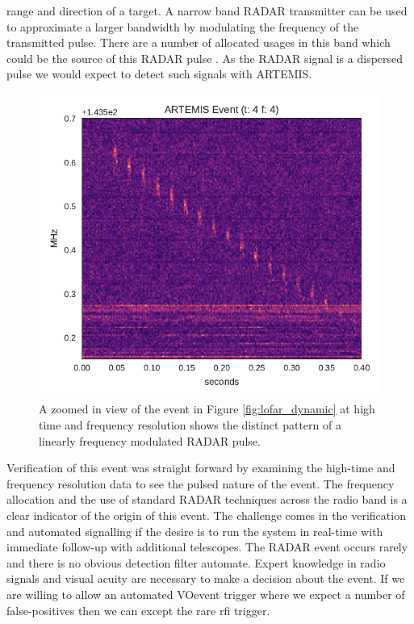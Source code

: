 \documentclass[a4paper,fleqn,usenatbib]{mnras}
\begin{document}
range and direction of a target. A narrow band RADAR transmitter can be used to
approximate a larger bandwidth by modulating the frequency of the transmitted
pulse. There are a number of allocated usages in this band which could be the
source of this RADAR pulse \citep{ofcom2017}.  As the RADAR signal is a
dispersed pulse we would expect to detect such signals with ARTEMIS.
%
\begin{figure}
    \includegraphics[width=1.0\linewidth]{figures/LOFAR_dynamic_high_res.pdf}
    \caption{A zoomed in view of the event in Figure \ref{fig:lofar_dynamic} at
    high time and frequency resolution shows the distinct pattern of a linearly frequency
    modulated RADAR pulse.
    }
    \label{fig:lofar_dynamic_high}
\end{figure}
%
Verification of this event was straight forward by examining the high-time and
frequency resolution data to see the pulsed nature of the event. The frequency
allocation and the use of standard RADAR techniques across the radio band is a
clear indicator of the origin of this event. The challenge comes in the
verification and automated signalling if the desire is to run the system in
real-time with immediate follow-up with additional telescopes. The RADAR event
occurs rarely and there is no obvious detection filter automate. Expert
knowledge in radio signals and visual acuity are necessary to make a decision
about the event. If we are willing to allow an automated VOevent trigger where
we expect a number of false-positives then we can except the rare \gls{rfi}
trigger.
\end{document}
